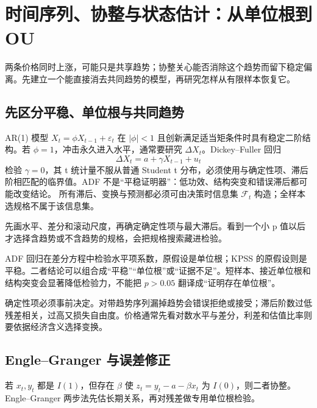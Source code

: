 \chapter{时间序列、协整与状态估计：从单位根到 OU}
\label{ch:lower-stat-arb-model}

\begin{itemize}
  
\end{itemize}

两条价格同时上涨，可能只是共享趋势；协整关心能否消除这个趋势而留下稳定偏离。先建立一个能直接消去共同趋势的模型，再研究怎样从有限样本恢复它。


\section{先区分平稳、单位根与共同趋势}

AR(1) 模型 $X_t=\phi X_{t-1}+\varepsilon_t$ 在 $|\phi|<1$ 且创新满足适当矩条件时具有稳定二阶结构。若 $\phi=1$，冲击永久进入水平，通常要研究 $\Delta X_t$。Dickey--Fuller 回归
\[
\Delta X_t=a+\gamma X_{t-1}+u_t
\]
检验 $\gamma=0$，其 t 统计量不服从普通 Student t 分布，必须使用与确定性项、滞后阶相匹配的临界值。ADF 不是“平稳证明器”：低功效、结构突变和错误滞后都可能改变结论。
所有滞后、变换与预测都必须可由决策时信息集 $\mathcal F_t$ 构造；全样本选规格不属于该信息集。

\begin{diagnostic}
先画水平、差分和滚动尺度，再确定确定性项与最大滞后。看到一个小 p 值以后才选择含趋势或不含趋势的规格，会把规格搜索藏进检验。
\end{diagnostic}


ADF 回归在差分方程中检验水平项系数，原假设是单位根；KPSS 的原假设则是平稳。二者结论可以组合成“平稳”“单位根”或“证据不足”。短样本、接近单位根和结构突变会显著降低检验力，不能把 $p>0.05$ 翻译成“证明存在单位根”。

确定性项必须事前决定。对带趋势序列漏掉趋势会错误拒绝或接受；滞后阶数过低残差相关，过高又损失自由度。价格通常先看对数水平与差分，利差和估值比率则要依据经济含义选择变换。

\section{Engle--Granger 与误差修正}

若 $x_t,y_t$ 都是 $I(1)$，但存在 $\beta$ 使 $z_t=y_t-a-\beta x_t$ 为 $I(0)$，则二者协整。Engle--Granger 两步法先估长期关系，再对残差做专用单位根检验\cite{engle1987cointegration}。

